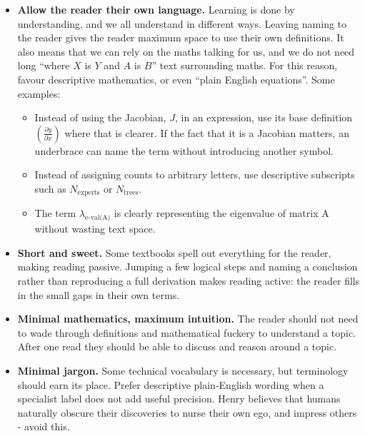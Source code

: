 \begin{itemize}
    \item \textbf{Allow the reader their own language.}
    Learning is done by understanding, and we all understand in different ways.
    Leaving naming to the reader gives the reader maximum space to use their own definitions.
    It also means that we can rely on the maths talking for us, and we do not need long ``where $X$ is $Y$ and $A$ is $B$'' text surrounding maths.
    For this reason, favour descriptive mathematics, or even ``plain English equations''.
    Some examples:
    \begin{itemize}
        \item Instead of using the Jacobian, $J$, in an expression, use its base definition $\left(\frac{\partial y}{\partial x}\right)$ where that is clearer. If the fact that it is a Jacobian matters, an underbrace can name the term without introducing another symbol.
        \item Instead of assigning counts to arbitrary letters, use descriptive subscripts such as $N_{\text{experts}}$ or $N_{\text{trees}}$.
        \item The term $\lambda_{\text{e-val(A)}}$ is clearly representing the eigenvalue of matrix A without wasting text space.
    \end{itemize}

    \item \textbf{Short and sweet.}
    Some textbooks spell out everything for the reader, making reading passive.
    Jumping a few logical steps and naming a conclusion rather than reproducing a full derivation makes reading active: the reader fills in the small gaps in their own terms.

    \item \textbf{Minimal mathematics, maximum intuition.}
    The reader should not need to wade through definitions and mathematical fuckery to understand a topic.
    After one read they should be able to discuss and reason around a topic.

    \item \textbf{Minimal jargon.}
    Some technical vocabulary is necessary, but terminology should earn its place.
    Prefer descriptive plain-English wording when a specialist label does not add useful precision.
    Henry believes that humans naturally obscure their discoveries to nurse their own ego, and impress others - avoid this. 
    

\end{itemize}
